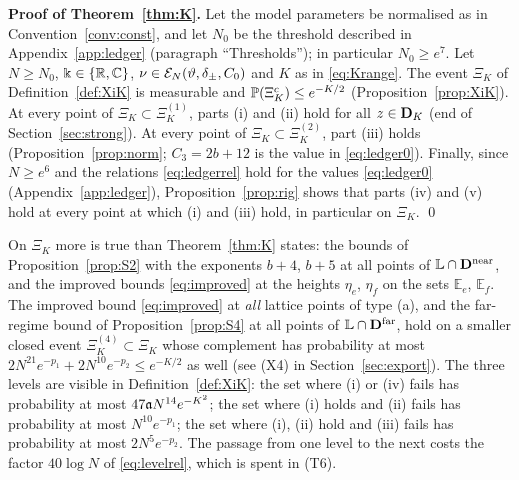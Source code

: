 \medskip\noindent\textbf{Proof of Theorem~\ref{thm:K}.} Let the model parameters be normalised as in Convention~\ref{conv:const}, and let $N_0$ be the threshold described in Appendix~\ref{app:ledger} (paragraph ``Thresholds''); in particular $N_0\ge e^{7}$.
Let $N\ge N_0$, $\Bbbk\in\{\mathbb{R},\mathbb{C}\}$, $\nu\in\mathcal E_N(\vartheta,\delta_\pm,C_0)$ and $K$ as in \eqref{eq:Krange}. The event $\Xi_K$ of Definition~\ref{def:XiK} is measurable and $\mathbb{P}(\Xi_K^c)\le e^{-K/2}$ (Proposition~\ref{prop:XiK}).
At every point of $\Xi_K\subset\Xi_K^{(1)}$, parts (i) and (ii) hold for all $z\in\mathbf{D}_K$ (end of Section~\ref{sec:strong}). At every point of $\Xi_K\subset\Xi_K^{(2)}$, part (iii) holds (Proposition~\ref{prop:norm}; $C_3=2b+12$ is the value in \eqref{eq:ledger0}).
Finally, since $N\ge e^6$ and the relations \eqref{eq:ledgerrel} hold for the values \eqref{eq:ledger0} (Appendix~\ref{app:ledger}), Proposition~\ref{prop:rig} shows that parts (iv) and (v) hold at every point at which (i) and (iii) hold, in particular on $\Xi_K$. \qed

\begin{remark}\label{rem:XiK}
On $\Xi_K$ more is true than Theorem~\ref{thm:K} states: the bounds of Proposition~\ref{prop:S2} with the exponents $b+4$, $b+5$ at all points of $\mathbb L\cap\mathbf{D}^{\rm near}$, and the improved bounds \eqref{eq:improved} at the heights $\eta_e$, $\eta_f$ on the sets $\mathbb E_e$, $\mathbb E_f$.
The improved bound \eqref{eq:improved} at \emph{all} lattice points of type (a), and the far-regime bound of Proposition~\ref{prop:S4} at all points of $\mathbb L\cap\mathbf{D}^{\rm far}$, hold on a smaller closed event $\Xi_K^{(4)}\subset\Xi_K$ whose complement has probability at most $2N^{21}e^{-p_1}+2N^{10}e^{-p_2}\le e^{-K/2}$ as well (see (X4) in Section~\ref{sec:export}).
The three levels are visible in Definition~\ref{def:XiK}: the set where (i) or (iv) fails has probability at most $47\mathfrak{a} N^{14}e^{-K^2}$; the set where (i) holds and (ii) fails has probability at most $N^{10}e^{-p_1}$;
the set where (i), (ii) hold and (iii) fails has probability at most $2N^{5}e^{-p_2}$. The passage from one level to the next costs the factor $40\log N$ of \eqref{eq:levelrel}, which is spent in (T6).
\end{remark}
